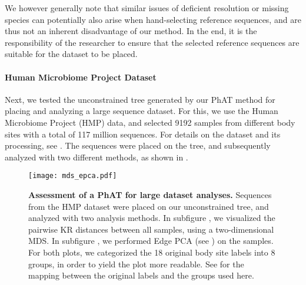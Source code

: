 We however generally note that similar issues of deficient resolution or missing species
can potentially also arise when hand-selecting reference sequences,
and are thus not an inherent disadvantage of our method.
In the end, it is the responsibility of the researcher to ensure that the selected reference sequences
are suitable for the dataset to be placed.

\paragraph{Human Microbiome Project Dataset}
\label{ch:AutomaticTrees:sec:Evaluation:sub:EmpiricalDatasets:par:HMP}

Next, we tested the unconstrained  tree generated by our \ac{PhAT} method
for placing and analyzing a large sequence dataset.
For this, we use the Human Microbiome Project (HMP) \cite{Huttenhower2012,Methe2012} data,
and selected \num{9192} samples from different body sites with a total of 117 million sequences.
For details on the dataset and its processing, see .
The sequences were placed on the tree, and subsequently analyzed with two different methods,
as shown in .

\begin{figure}[thb!]
    \centering
    \texttt{[image: mds\_epca.pdf]}
    \begin{subfigure}{0pt}
        \label{fig:hmp_mds_epca:sub:mds}
    \end{subfigure}
    \begin{subfigure}{0pt}
        \label{fig:hmp_mds_epca:sub:edge_pca}
    \end{subfigure}
    \caption[Assessment of a \acs{PhAT} for large dataset analyses]{
        \textbf{Assessment of a \acs{PhAT} for large dataset analyses.}
        Sequences from the HMP dataset \cite{Huttenhower2012,Methe2012} were placed
        on our unconstrained  tree, and analyzed with two analysis methods.
        In subfigure , we visualized the pairwise KR distances between all samples,
        using a two-dimensional \acf{MDS}.
        In subfigure , we performed Edge PCA
        (see ) on the samples.
        For both plots, we categorized the \num{18} original body site labels into \num{8} groups,
        in order to yield the plot more readable.
        See  for the mapping between the original labels and the groups used here.
    }
    \label{fig:hmp_mds_epca}
\end{figure}

